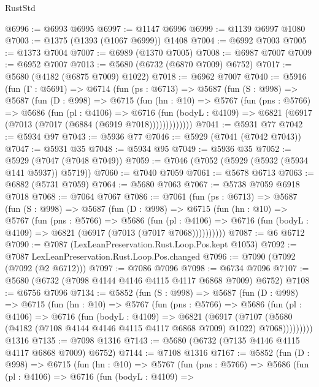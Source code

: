 \begin{lexlean}{RustStd}
\begin{coremodule}
@6996 := @6993 @6995
@6997 := @1147 @6996
@6999 := @1139 @6997 @1080
@7003 := @1375 (@1393 (@1067 @6999)) @1408
@7004 := @6992 @7003
@7005 := @1373 @7004
@7007 := @6989 (@1370 @7005)
@7008 := @6987 @7007
@7009 := @6952 @7007
@7013 := @5680 (@6732 (@6870 @7009) @6752)
@7017 := @5680 (@4182 (@6875 @7009) @1022)
@7018 := @6962 @7007
@7040 := @5916
    (fun (Γ : @5691) =>
    @6714
      (fun (ps : @6713) =>
      @5687
        (fun (S : @998) =>
        @5687
          (fun (D : @998) =>
          @6715
            (fun (hn : @10) =>
            @5767
              (fun (pns : @5766) =>
              @5686
                (fun (pl : @4106) =>
                @6716
                  (fun (bodyL : @4109) =>
                  @6821 (@6917 (@7013 (@7017 (@6884 (@6919 @7018)))))))))))))
@7041 := @5931 @77
@7042 := @5934 @97
@7043 := @5936 @77
@7046 := @5929 (@7041 (@7042 @7043))
@7047 := @5931 @35
@7048 := @5934 @95
@7049 := @5936 @35
@7052 := @5929 (@7047 (@7048 @7049))
@7059 := @7046 (@7052 (@5929 (@5932 (@5934 @141 @5937)) @5719))
@7060 := @7040 @7059
@7061 := @5678 @6713
@7063 := @6882 (@5731 @7059)
@7064 := @5680 @7063
@7067 := @5738 @7059 @6918 @7018
@7068 := @7064 @7067
@7086 := @7061
    (fun (ps : @6713) =>
    @5687
      (fun (S : @998) =>
      @5687
        (fun (D : @998) =>
        @6715
          (fun (hn : @10) =>
          @5767
            (fun (pns : @5766) =>
            @5686
              (fun (pl : @4106) =>
              @6716 (fun (bodyL : @4109) => @6821 (@6917 (@7013 (@7017 @7068))))))))))
@7087 := @6 @6712
@7090 := @7087 (LexLeanPreservation.Rust.Loop.Pos.kept @1053)
@7092 := @7087 LexLeanPreservation.Rust.Loop.Pos.changed
@7096 := @7090 (@7092 (@7092 (@2 @6712)))
@7097 := @7086 @7096
@7098 := @6734 @7096
@7107 := @5680 (@6732 (@7098 @4144 @4146 @4115 @4117 @6868 @7009) @6752)
@7108 := @6756 @7096
@7134 := @5852
    (fun (S : @998) =>
    @5687
      (fun (D : @998) =>
      @6715
        (fun (hn : @10) =>
        @5767
          (fun (pns : @5766) =>
          @5686
            (fun (pl : @4106) =>
            @6716
              (fun (bodyL : @4109) =>
              @6821
                (@6917
                  (@7107
                    (@5680 (@4182 (@7108 @4144 @4146 @4115 @4117 @6868 @7009) @1022) @7068)))))))))
    @1316
@7135 := @7098 @1316
@7143 := @5680 (@6732 (@7135 @4146 @4115 @4117 @6868 @7009) @6752)
@7144 := @7108 @1316
@7167 := @5852
    (fun (D : @998) =>
    @6715
      (fun (hn : @10) =>
      @5767
        (fun (pns : @5766) =>
        @5686
          (fun (pl : @4106) =>
          @6716
            (fun (bodyL : @4109) =>

\end{coremodule}
\end{lexlean}
